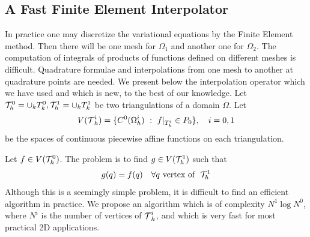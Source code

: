 \documentclass[a4paper,twoside,12pt]{book}
\def\setS#1{#1\label{sec:#1}}
\begin{document}
\subsection{A \setS{Fast Finite Element Interpolator}}
\medskip
In practice one may discretize the variational equations by the Finite Element method. Then
there will be one mesh for $\Omega_1$ and another one for $\Omega_2$.  The computation
of integrals of products of functions defined on different meshes is difficult.
Quadrature formulae and interpolations from one mesh to another at quadrature points are needed.
We present below the interpolation operator which we have used and which is new,
to the best of our knowledge.
\bigskip
Let ${\cal T}_{h}^0=\cup_k T^0_k,{\cal T}_{h}^1=\cup_k T^1_k$ be two triangulations of a domain $\Omega$.
Let
$$
V({\hbox{${\cal T}$}_{h}^i}) =\{ C^0(\Omega_h^i)~:~f|_{T^i_k}\in P_0\},~~~i=0,1
$$
be the spaces of continuous piecewise affine functions on each triangulation.

Let $f\in V({\cal T}_{h}^0)$. The problem is to find $g\in V({\cal T}_{h}^1)$ such that
$$
g(q) = f(q) \quad \forall q\hbox{~vertex of ~} {\cal T}_{h}^1
$$
Although this is a seemingly simple problem, it is difficult to find an
efficient algorithm in practice.
We propose an algorithm which is of complexity  $N^1\log N^0$, where $N^i$ is
the number of vertices of ${\hbox{${\cal T}$}_{h}^i}$, and which
is very fast for most practical 2D applications.
\bigskip
\end{document}
